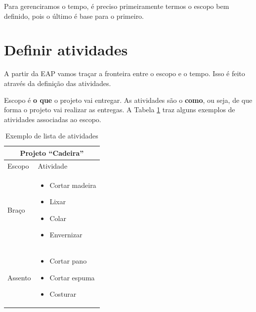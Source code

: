

Para gerenciramos o tempo, é preciso primeiramente termos o escopo bem definido, pois o último é base para o primeiro.

\section{Definir atividades}

A partir da EAP vamos traçar a fronteira entre o escopo e o tempo. Isso é feito através da definição das atividades.

Escopo é \textbf{o que} o projeto vai entregar. As atividades são o \textbf{como}, ou seja, de que forma o projeto vai realizar as entregas. A Tabela \ref{tab:ativ:ex} traz alguns exemplos de atividades associadas ao escopo.

\begin{table}[h!]\footnotesize
\centering
\begin{tabular}
{
 	|p{}
	| >{\centering\arraybackslash}p{}|
}

	\hline

	\multicolumn{2}{c}{Projeto ``Cadeira''}\\
	
	\hline
	
	Escopo&
	Atividade\\
	
	\hline

	Braço&
	\begin{itemize}
		\item Cortar madeira
		\item Lixar
		\item Colar
		\item Envernizar
	\end{itemize}\\
	
	\hline

	Assento&
	\begin{itemize}
		\item Cortar pano
		\item Cortar espuma
		\item Costurar
	\end{itemize}\\

	\hline

\end{tabular}
\caption {Exemplo de lista de atividades}
\label{tab:ativ:ex}
\end{table}

